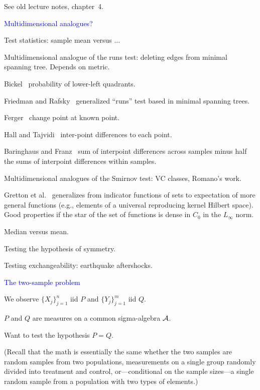 \documentclass[landscape]{slides}
\newcommand{\cA}{{\cal A}}
\begin{document}
\begin{slide}
\begin{slide}
See old lecture notes, chapter~4.

\end{slide}

\begin{slide}
{\textcolor{blue}{Multidimensional analogues?}}

Test statistics: sample mean versus ...

Multidimensional analogue of the runs test: deleting edges from
minimal spanning tree.  Depends on metric.

Bickel~\cite{bickel69} probability of lower-left quadrants.

Friedman and Rafsky~\cite{friedmanRafsky79} generalized ``runs'' test based in minimal
spanning trees.

Ferger~\cite{ferger00} change point at known point.

Hall and Tajvidi~\cite{hallTajvidi02} inter-point differences to each point.
 
Baringhaus and Franz~\cite{baringHausFranz04} sum of interpoint differences across
samples minus half the sums of interpoint differences within samples.

Multidimensional analogues of the Smirnov test:
VC classes, Romano's work.

Gretton et al.~\cite{grettonEtal04} generalizes from indicator functions of sets
to expectation of more general functions (e.g., elements of a universal
reproducing kernel Hilbert space).  Good properties if the
star of the set of functions is dense in $C_0$ in the $L_\infty$ norm.

Median versus mean.

Testing the hypothesis of symmetry.

Testing exchangeability: earthquake aftershocks.

\end{slide}

\begin{slide}
{\textcolor{blue}{The two-sample problem}}

We observe $\{X_j \}_{j=1}^n$ iid $P$ and $\{Y_j\}_{j=1}^m$ iid $Q$. 

$P$ and $Q$ are measures on a common sigma-algebra $\cA$. 

Want to test the hypothesis $P = Q$.

(Recall that the math is essentially the same whether the two samples
are random samples from two populations, measurements on a single
group randomly divided into treatment and control, or---conditional on the
sample sizes---a single random sample from a population with two types
of elements.)


\end{slide}
\end{slide}
\end{document}
